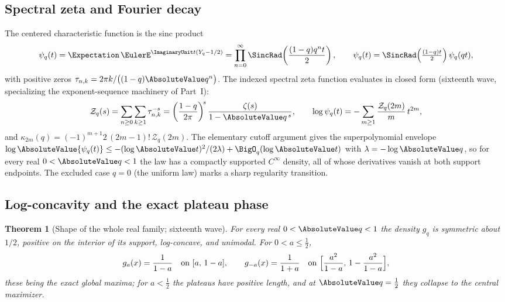\documentclass[11pt,oneside]{article}
\numberwithin{equation}{section}
\newtheorem{theorem}{Theorem}[section]
\theoremstyle{definition}
\theoremstyle{remark}
\newcommand{\Zspec}{\mathcal Z}
\begin{document}
\subsection{Spectral zeta and Fourier decay}

The centered characteristic function is the sinc product
\begin{equation}\label{p7:eq:psi-sinc}
 \psi_q(t)=\Expectation\,\EulerE^{\ImaginaryUnit t(Y_q-1/2)}
 =\prod_{n=0}^{\infty}
 \SincRad\!\left(\frac{(1-q)q^nt}{2}\right),
 \qquad
 \psi_q(t)=\SincRad\!\left(\tfrac{(1-q)t}2\right)\psi_q(qt),
\end{equation}
with positive zeros $\tau_{n,k}=2\pi k/\bigl((1-q)\AbsoluteValue q^n\bigr)$.  The
indexed spectral zeta function evaluates in closed form (sixteenth wave,
specializing the exponent-sequence machinery of Part~I):
\begin{equation}\label{p7:eq:spectral-zeta}
 \Zspec_q(s)=\sum_{n\ge0}\sum_{k\ge1}\tau_{n,k}^{-s}
 =\left(\frac{1-q}{2\pi}\right)^{\!s}\frac{\zeta(s)}{1-\AbsoluteValue q^{\,s}},
 \qquad
 \log\psi_q(t)=-\sum_{m\ge1}\frac{\Zspec_q(2m)}m\,t^{2m},
\end{equation}
and $\kappa_{2m}(q)=(-1)^{m+1}2\,(2m-1)!\,\Zspec_q(2m)$.  The elementary
cutoff argument gives the superpolynomial envelope
$\log\AbsoluteValue{\psi_q(t)}\le-(\log\AbsoluteValue t)^2/(2\lambda)+\BigO_q(\log\AbsoluteValue t)$ with
$\lambda=-\log\AbsoluteValue q$, so for every real $0<\AbsoluteValue q<1$ the law has a compactly
supported $C^\infty$ density, all of whose derivatives vanish at both support
endpoints.  The excluded case $q=0$ (the uniform law) marks a sharp regularity
transition.

\subsection{Log-concavity and the exact plateau phase}

\begin{theorem}[Shape of the whole real family; sixteenth wave]
\label{p7:thm:shape}
For every real $0<\AbsoluteValue q<1$ the density $g_q$ is symmetric about $1/2$,
positive on the interior of its support, log-concave, and unimodal.  For
$0<a\le\tfrac12$,
\begin{equation}\label{p7:eq:plateau}
 g_a(x)=\frac1{1-a}
 \quad\text{on }[a,\,1-a],
 \qquad
 g_{-a}(x)=\frac1{1+a}
 \quad\text{on }\Bigl[\frac{a^2}{1-a},\,1-\frac{a^2}{1-a}\Bigr],
\end{equation}
these being the exact global maxima; for $a<\tfrac12$ the plateaus have
positive length, and at $\AbsoluteValue q=\tfrac12$ they collapse to the central
maximizer.
\end{theorem}
\end{document}

